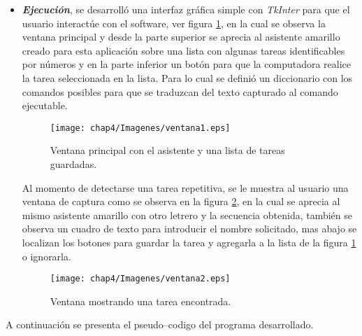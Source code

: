 \begin{itemize}
\item{ \textbf{\emph{Ejecuci\'on}}, se desarroll\'o una interfaz gr\'afica 
 simple con \emph{TkInter} para que el usuario interact\'ue con el software,  
 ver figura \ref{fig:v01}, en la cual se observa la ventana principal y 
 desde la parte superior se aprecia al asistente amarillo creado para esta 
 aplicaci\'on sobre una lista con algunas tareas identificables por 
 n\'umeros y en la parte inferior un bot\'on para que la computadora realice 
 la tarea seleccionada en la lista. Para lo cual se defini\'o un diccionario 
 con los comandos posibles para que se traduzcan del texto capturado al 
 comando ejecutable. 


\begin{figure}[H]
\centering
\texttt{[image: chap4/Imagenes/ventana1.eps]}
\caption{Ventana principal con el asistente y una lista de tareas
 guardadas.}
\label{fig:v01}
\end{figure} 


Al momento de detectarse una tarea repetitiva, se le muestra al usuario una 
 ventana de captura como se observa en la figura \ref{fig:v02}, en la cual 
 se aprecia al mismo asistente amarillo con otro letrero y la secuencia 
 obtenida, tambi\'en se observa un cuadro de texto para introducir el nombre 
 solicitado, mas abajo se localizan los botones para guardar la tarea y 
 agregarla a la lista de la figura \ref{fig:v01} o ignorarla.}

\begin{figure}[H]
\centering
\texttt{[image: chap4/Imagenes/ventana2.eps]}
\caption{Ventana mostrando una tarea encontrada.}
\label{fig:v02}
\end{figure}


\end{itemize}

A continuaci\'on se presenta el pseudo--codigo del programa desarrollado.


